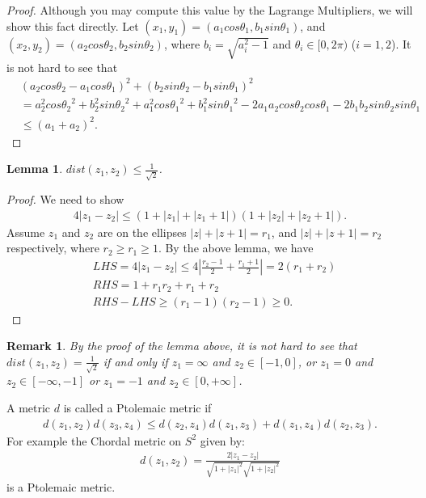 \documentclass{amsart}
\newtheorem{lemma}{Lemma}[section]
\newtheorem{remark}{Remark}[section]
\begin{document}
\begin{proof}
Although you may compute this value by the Lagrange Multipliers, we will show this fact directly.
Let $(x_1, y_1) = (a_1 cos\theta_1, b_1 sin \theta_1)$, and $(x_2, y_2) = (a_2 cos\theta_2, b_2 sin \theta_2)$, where
$b_i = \sqrt{a_{i}^{2} - 1}$ and $\theta_i \in [0, 2\pi)$ ($i = 1,2$). It is not hard to see that
\begin{align*}
&(a_2 cos\theta_2 - a_1 cos\theta_1)^2 + ( b_2 sin \theta_2 -  b_1 sin \theta_1)^2 \\
&= a_{2}^{2}{cos\theta_{2}}^2 + b^{2}_2 {sin \theta_2}^{2} + a_{1}^{2}{cos\theta_{1}}^2 +  b^{2}_1 {sin \theta_1}^{2}
 -2a_1 a_2 cos\theta_{2} cos\theta_{1} - 2b_1 b_2 sin \theta_2 sin \theta_1 \\
&\leq (a_1 + a_2)^2.
\end{align*}
\end{proof}

\begin{lemma}
$dist(z_1 , z_2) \leq \frac{1}{\sqrt{2}}$.
\end{lemma}

\begin{proof}
We need to show
\begin{align*}
4|z_1 - z_2| \leq (1 + |z_1| + |z_1 + 1|)(1 + |z_2| + |z_2 + 1|).
\end{align*}
Assume $z_1$ and $z_2$ are on the ellipses $|z|+|z+1| = r_1$, and
$|z|+|z+1| = r_2$ respectively, where $r_2 \geq r_1 \geq 1$. By the above lemma,
we have
\begin{align*}
&LHS = 4|z_1 - z_2| \leq 4|\frac{r_2-1}{2} + \frac{r_1 + 1}{2}| = 2(r_1 + r_2) \\
&RHS = 1 + r_1 r_2 + r_1 + r_2\\
&RHS - LHS \geq (r_1 - 1)(r_2 -1) \geq 0.
\end{align*}
\end{proof}

\begin{remark}
By the proof of the lemma above, it is not hard to see that $dist(z_1, z_2) =\frac{1}{\sqrt{2}}$ if and only if
$z_1 = \infty$ and $z_2 \in [-1, 0]$, or $z_1 = 0$ and $z_2 \in [-\infty , -1]$ or $z_1 = -1$ and $z_2 \in [0, +\infty]$.
\end{remark}

A metric $d$ is called a Ptolemaic metric if
\begin{align*}
d(z_1, z_2)d(z_3, z_4) \leq d(z_2, z_4)d(z_1, z_3) + d(z_1, z_4)d(z_2, z_3).
\end{align*}
For example the Chordal metric on $S^{2}$ given by:
\begin{align*}
d(z_1, z_2) = \frac{2|z_1 - z_2|}{\sqrt{1+|z_1|^2}\sqrt{1+|z_2|^2}}
\end{align*}
is a Ptolemaic metric.
\end{document}
